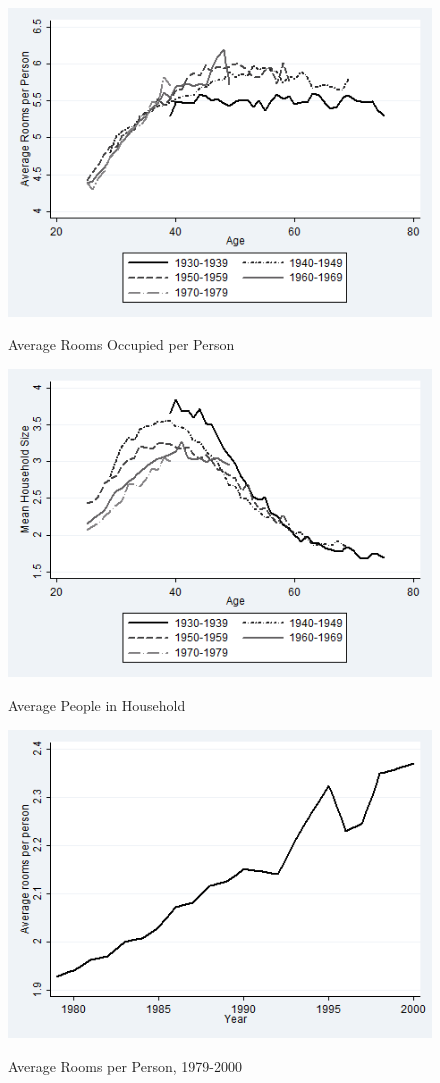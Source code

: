 \begin{figure}
\caption{Average Rooms Occupied per Person}
\centering
\includegraphics[width=.7\linewidth]{pictures/cohort_rooms.png}
\label{fig:cohort_rooms}
\end{figure}

\begin{figure}
\caption{Average People in Household}
\centering
\includegraphics[width=.7\linewidth]{pictures/av_peep.png}
\label{fig:cohort_peeps}
\end{figure}


\begin{figure}
\caption{Average Rooms per Person, 1979-2000}
\centering
\includegraphics[width=0.7\linewidth]{pictures/rooms_pp.png}
\label{fig:room_time}
\end{figure}



